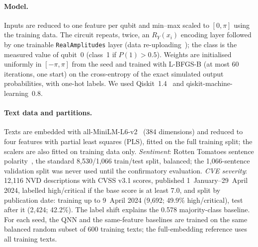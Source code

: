 \documentclass[11pt]{article}
\begin{document}
\paragraph{Model.} Inputs are reduced to one feature per qubit and min--max scaled to $[0,\pi]$ using the training data. The circuit repeats, twice, an $R_Y(x_i)$ encoding layer followed by one trainable \texttt{RealAmplitudes} layer (data re-uploading~\cite{perezsalinas2020reuploading,schuld2021encoding}); the class is the measured value of qubit~0 (class~1 if $P(1) > 0.5$). Weights are initialised uniformly in $[-\pi,\pi]$ from the seed and trained with L-BFGS-B (at most 60 iterations, one start) on the cross-entropy of the exact simulated output probabilities, with one-hot labels. We used Qiskit~1.4~\cite{qiskit} and qiskit-machine-learning~0.8.

\paragraph{Text data and partitions.} Texts are embedded with all-MiniLM-L6-v2~\cite{reimers2019sbert} (384 dimensions) and reduced to four features with partial least squares (PLS), fitted on the full training split; the scalers are also fitted on training data only.
\emph{Sentiment}: Rotten Tomatoes sentence polarity~\cite{pang2005seeing}, the standard 8{,}530/1{,}066 train/test split, balanced; the 1{,}066-sentence validation split was never used until the confirmatory evaluation.
\emph{CVE severity}: 12{,}116 NVD descriptions with CVSS v3.1 scores, published 1~January--29~April 2024, labelled high/critical if the base score is at least 7.0, and split by publication date: training up to 9~April 2024 (9{,}692; 49.9\% high/critical), test after it (2{,}424; 42.2\%). The label shift explains the 0.578 majority-class baseline.
For each seed, the QNN and the same-feature baselines are trained on the same balanced random subset of 600 training texts; the full-embedding reference uses all training texts.
\end{document}
